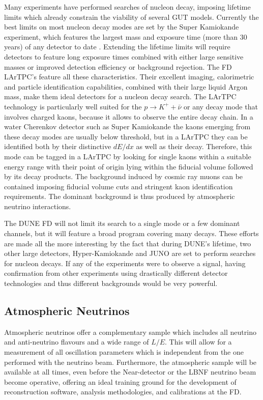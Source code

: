 Many experiments have performed searches of nucleon decay, imposing lifetime limits which already constrain the viability of several GUT models. Currently the best limits on most nucleon decay modes are set by the Super Kamiokande experiment, which features the largest mass and exposure time (more than 30 years) of any detector to date \cite{Super-Kamiokande:2014otb, Super-Kamiokande:2016exg, Super-Kamiokande:2017gev}. Extending the lifetime limits will require detectors to feature long exposure times combined with either large sensitive masses or improved detection efficiency or background rejection. The FD LArTPC's feature all these characteristics. Their excellent imaging, calorimetric and particle identification capabilities, combined with their large liquid Argon mass, make them ideal detectors for a nucleon decay search. The LArTPC technology is particularly well suited for the $p\rightarrow K^+ +\bar{\nu}$ or any decay mode that involves charged kaons, because it allows to observe the entire decay chain. In a water Cherenkov detector such as Super Kamiokande the kaons emerging from these decay modes are usually below threshold, but in a LArTPC they can be identified both by their distinctive $dE/dx$ as well as their decay. Therefore, this mode can be tagged in a LArTPC by looking for single kaons within a suitable energy range with their point of origin lying within the fiducial volume followed by its decay products. The background induced by cosmic ray muons can be contained imposing fiducial volume cuts and stringent kaon identification requirements. The dominant background is thus produced by atmospheric neutrino interactions.

The DUNE FD will not limit its search to a single mode or a few dominant channels, but it will feature a broad program covering many decays. These efforts are made all the more interesting by the fact that during DUNE's lifetime, two other large detectors, Hyper-Kamiokande \cite{Hyper-Kamiokande:2018ofw} and JUNO \cite{JUNO:2015sjr} are set to perform searches for nucleon decays. If any of the experiments were to observe a signal, having confirmation from other experiments using drastically different detector technologies and thus different backgrounds would be very powerful.

\subsection{Atmospheric Neutrinos}
\label{Sec:AtmosphericNeutrinos}

Atmospheric neutrinos offer a complementary sample which includes all neutrino and anti-neutrino flavours and a wide range of $L/E$. This will allow for a measurement of all oscillation parameters which is independent from the one performed with the neutrino beam. Furthermore, the atmospheric sample will be available at all times, even before the Near-detector or the LBNF neutrino beam become operative, offering an ideal training ground for the development of reconstruction software, analysis methodologies, and calibrations at the FD.

